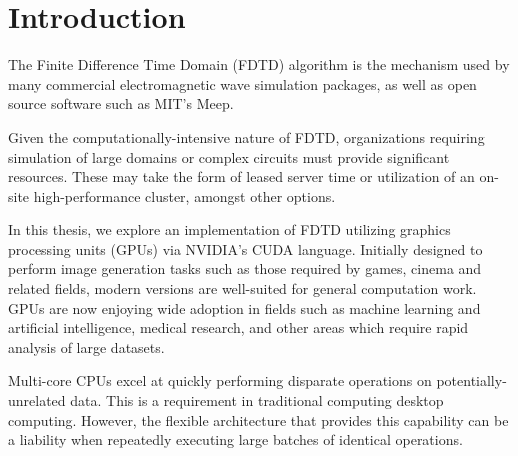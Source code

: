 
\chapter{Introduction} \label{ch:introduction}


%
%



The Finite Difference Time Domain (FDTD)\cite{Yee} algorithm is the mechanism used by many commercial electromagnetic wave simulation packages, as well as open source software such as MIT's Meep\cite{OskooiRo10}. 

Given the computationally-intensive nature of FDTD, organizations requiring simulation of large domains or complex circuits must provide significant resources. These may take the form of leased server time or utilization of an on-site high-performance cluster, amongst other options.

In this thesis, we explore an implementation of FDTD utilizing graphics processing units (GPUs) via NVIDIA's CUDA\cite{cuda} language. Initially designed to perform image generation tasks such as those required by games, cinema and related fields, modern versions are well-suited for general computation work. GPUs are now enjoying wide adoption in fields such as machine learning\cite{Raina09largescaledeep} and artificial intelligence\cite{wu2009clustering}, medical research\cite{QIMS1079}, and other areas which require rapid analysis of large datasets.

Multi-core CPUs excel at quickly performing disparate operations on potentially-unrelated data. This is a requirement in traditional computing desktop computing. However, the flexible architecture that provides this capability can be a liability when repeatedly executing large batches of identical operations. 

